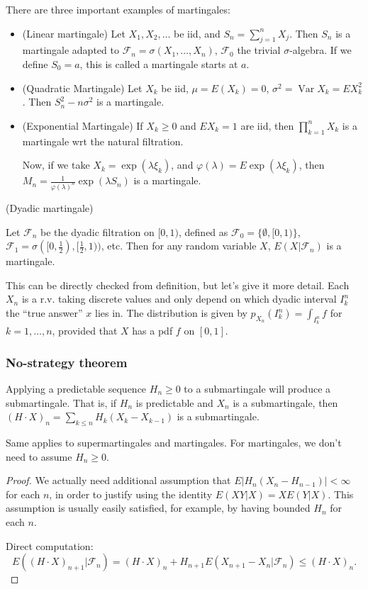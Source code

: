 There are three important examples of martingales:
\begin{itemize}
	\item (Linear martingale)
	Let  $X_1, X_2, \ldots$ be iid, and $S_n = \sum_{j = 1}^n X_j$. Then $S_n$ is a martingale adapted to $\mathcal{F}_n = \sigma(X_1, \ldots, X_n)$,  $\mathcal{F}_0$ the trivial $\sigma$-algebra. If we define $S_0 = a$, this is called a martingale starts at $a$.
\item (Quadratic Martingale)
	Let $X_ k$ be iid, $\mu = E(X_k) = 0$, $\sigma^2 = \operatorname{Var} X_k = E X_k^2$. Then $S_n^2 - n \sigma^2$ is a martingale.
\item (Exponential Martingale)
	If $X_k \ge 0$ and $E X_k = 1$ are iid, then $\prod_{k = 1}^n X_k $ is a martingale wrt the natural filtration.

	Now, if we take $X_k = \exp(\lambda \xi_k)$, and $\varphi(\lambda) = E \exp(\lambda \xi_k)$, then $M_n = \frac{1}{\varphi(\lambda)^n} \exp(\lambda S_n)$ is a martingale.
\end{itemize}

\begin{example}
	(Dyadic martingale)

	Let $\mathcal{F}_n$ be the dyadic filtration on $[0,1)$, defined as $\mathcal{F}_0 = \{\emptyset , [0,1)\} $, $\mathcal{F}_1 = \sigma([0,\frac{1}{2}), [\frac{1}{2}, 1))$, etc. Then for any random variable $X$, $E(X | \mathcal{F}_n)$ is a martingale.

	This can be directly checked from definition, but let's give it more detail. Each $X_n$ is a r.v. taking discrete values and only depend on which dyadic interval $I^n_k$ the ``true answer'' $x$ lies in. The distribution is given by $p_{X_n}(I^n_k) = \int _{I^n_k} f$ for $k = 1, \ldots, n$, provided that $X$ has a pdf $f$ on $[0,1]$.
\end{example}

\subsubsection{No-strategy theorem}

\begin{theorem}
	Applying a predictable sequence $H_n \ge 0$ to a submartingale will produce a submartingale. That is, if $H_n$ is predictable and $X_n$ is a submartingale, then $(H\cdot X)_n = \sum_{k \le n}H_k (X_k - X_{k-1})$ is a submartingale.
\end{theorem}
Same applies to supermartingales and martingales. For martingales, we don't need to assume $H_n \ge 0$.
\begin{proof}
	We actually need additional assumption that $E\left| H_n (X_n - H_{n-1}) \right| < \infty $ for each $n$, in order to justify using the identity $E\left( XY | X \right) = X E(Y|X)$. This assumption is usually easily satisfied, for example, by having bounded $H_n$ for each $n$.

	Direct computation:
	\[
		E\left( (H \cdot X)_{n+1} | \mathcal{F}_n \right) 
		= (H \cdot X)_n + H_{n+1} E\left( X_{n+1} - X_n | \mathcal{F}_n \right) 
		\le (H \cdot X)_n
	.\] 
\end{proof}






